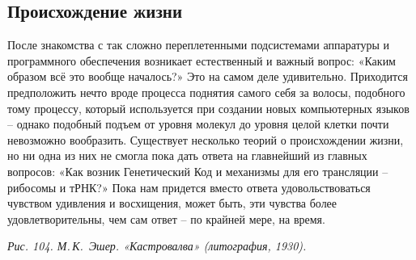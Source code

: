 \documentclass[../main.tex]{subfiles}
\begin{document}
\subsection{Происхождение жизни}

После знакомства с так сложно переплетенными подсистемами аппаратуры и программного обеспечения возникает естественный и важный вопрос: «Каким образом всё это вообще началось?» Это на самом деле удивительно. Приходится предположить нечто вроде процесса поднятия самого себя за волосы, подобного тому процессу, который используется при создании новых компьютерных языков \--- однако подобный подъем от уровня молекул до уровня целой клетки почти невозможно вообразить. Существует несколько теорий о происхождении жизни, но ни одна из них не смогла пока дать ответа на главнейший из главных вопросов: «Как возник Генетический Код и механизмы для его трансляции \--- рибосомы и тРНК?» Пока нам придется вместо ответа удовольствоваться чувством удивления и восхищения, может быть, эти чувства более удовлетворительны, чем сам ответ \--- по крайней мере, на время.

\emph{Рис. 104. М.\,К.~Эшер. «Кастровалва» (литография, 1930).}
\end{document}
